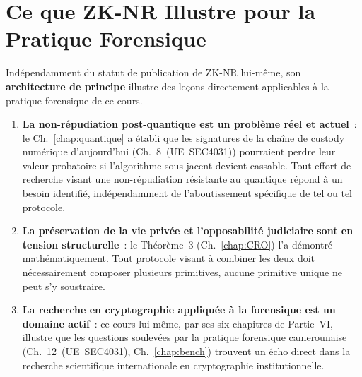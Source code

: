 \section{Ce que ZK-NR Illustre pour la Pratique Forensique}
\label{sec:illustration-pratique}

Indépendamment du statut de publication de ZK-NR lui-même, son
\textbf{architecture de principe} illustre des leçons directement
applicables à la pratique forensique de ce cours.

\begin{enumerate}
    \item \textbf{La non-répudiation post-quantique est un problème
          réel et actuel}~: le Ch.~\ref{chap:quantique} a établi
          que les signatures de la chaîne de custody numérique
          d'aujourd'hui (Ch.~8~(UE~SEC4031)) pourraient perdre
          leur valeur probatoire si l'algorithme sous-jacent
          devient cassable. Tout effort de recherche visant une
          non-répudiation résistante au quantique répond à un
          besoin identifié, indépendamment de l'aboutissement
          spécifique de tel ou tel protocole.
    \item \textbf{La préservation de la vie privée et l'opposabilité
          judiciaire sont en tension structurelle}~: le Théorème~3
          (Ch.~\ref{chap:CRO}) l'a démontré mathématiquement. Tout
          protocole visant à combiner les deux doit nécessairement
          composer plusieurs primitives, aucune primitive unique
          ne peut s'y soustraire.
    \item \textbf{La recherche en cryptographie appliquée à la
          forensique est un domaine actif}~: ce cours lui-même,
          par ses six chapitres de Partie~VI, illustre que les
          questions soulevées par la pratique forensique
          camerounaise (Ch.~12~(UE~SEC4031),
          Ch.~\ref{chap:bench}) trouvent un écho direct dans la
          recherche scientifique internationale en cryptographie
          institutionnelle.
\end{enumerate}

\separateur

